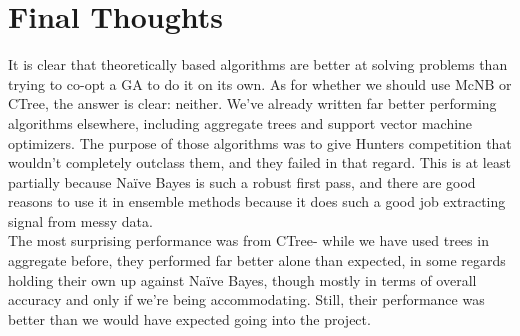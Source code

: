 \section{Final Thoughts}
It is clear that theoretically based algorithms are better at solving problems than trying to co-opt a GA to do it on its own.  
As for whether we should use McNB or CTree, the answer is clear: neither.  We've already written far better performing algorithms elsewhere, including aggregate trees and support vector machine optimizers.  The purpose of those algorithms was to give Hunters competition that wouldn't completely outclass them, and they failed in that regard.  This is at least partially because Na\"ive Bayes is such a robust first pass, and there are good reasons to use it in ensemble methods because it does such a good job extracting signal from messy data.\\
The most surprising performance was from CTree- while we have used trees in aggregate before, they performed far better alone than expected, in some regards holding their own up against Na\"ive Bayes, though mostly in terms of overall accuracy and only if we're being accommodating.  Still, their performance was better than we would have expected going into the project.\\
  